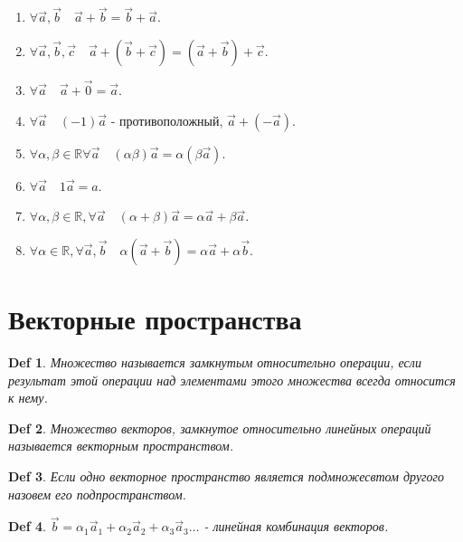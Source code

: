 \documentclass[a5paper, 10pt]{article}
\theoremstyle{plain}
\newtheorem{definition}{Def}
\newcommand{\R}{\mathbb R}
\begin{document}
    \begin{enumerate}
        \item $ \forall \vec{a}, \vec{b} \quad \vec{a} + \vec{b} = \vec{b} + \vec{a} $.
        \item $ \forall \vec{a}, \vec{b}, \vec{c} \quad
            \vec{a} + \left( \vec{b} + \vec{c} \right) =
            \left( \vec{a} + \vec{b} \right) + \vec{c} $.
        \item $ \forall \vec{a} \quad \vec{a} + \vec{0} = \vec{a} $.
        \item $ \forall \vec{a} \quad (-1) \vec{a} $ - противоположный, $ \vec{a} + (- \vec{a}) $.
        \item $ \forall \alpha, \beta \in \R \forall \vec{a} \quad
            (\alpha \beta) \vec{a} = \alpha (\beta \vec{a}) $.
        \item $ \forall \vec{a} \quad 1 \vec{a} = a $.
        \item $ \forall \alpha, \beta \in \R, \forall \vec{a} \quad
            \left( \alpha + \beta \right) \vec{a} = \alpha \vec{a} + \beta \vec{a} $.
        \item $ \forall \alpha \in \R, \forall \vec{a}, \vec{b} \quad
            \alpha \left( \vec{a} + \vec{b} \right) = \alpha \vec{a} + \alpha \vec{b} $.
    \end{enumerate}

    \section{Векторные пространства}

    \begin{definition}
    Множество называется замкнутым относительно операции, если результат этой операции
    над элементами этого множества всегда относится к нему.
    \end{definition}

    \begin{definition}
    Множество векторов, замкнутое относительно линейных операций называется векторным
    пространством.
    \end{definition}

    \begin{definition}
    Если одно векторное пространство является подмножесвтом другого назовем его подпространством.
    \end{definition}

    \begin{definition}
    $ \vec{b} =
        \alpha_1 \vec{a}_1 +
        \alpha_2 \vec{a}_2 +
        \alpha_3 \vec{a}_3
    \dots $ - линейная комбинация векторов.
    \end{definition}
\end{document}
